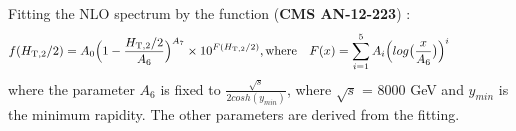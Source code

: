 \documentclass{beamer}
\begin{document}
\begin{frame}
\begin{center}
\begin{itemize}
\begin{itemize}
\end{itemize}
\end{itemize}
\vspace{2mm}\ball
\begin{itemize}
{\tiny \item Fitting the NLO \httwot spectrum by the function  (\textbf{CMS AN-12-223}) :
\begin{align*}
{f(\httwotns) = A_{0}\Big(1-\frac{\httwotns}{A_{6}}\Big)^{A_{7}} \times 10^{F(\httwotns)}}, {\rm where} ~~~{F(x) = \sum\limits_{i=1}^5 A_{i}\Big(log\big(\frac{x}{A_{6}}\big)\Big)^{i}}~~~~~~~~~~~~~~~
\end{align*}
where the parameter $A_{6}$ is fixed to $\frac{\sqrt{s}}{2cosh(y_{min})}$, where ${\sqrt{s}}$ = 8000 GeV and $y_{min}$ is the minimum rapidity. The other parameters are derived from the fitting.\\ }
\end{itemize}
\end{center}
\end{frame}
\end{document}
